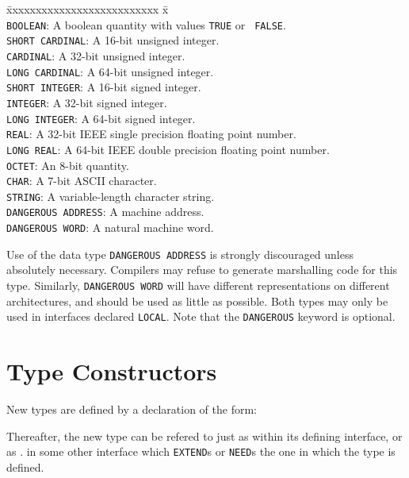 \begin{tabbing}
\= xxxxxxxxxxxxxxxxxxxxxxxxxx \= x \kill \\
\> {\tt BOOLEAN}: \> A boolean quantity with values {\tt TRUE} or {\tt
FALSE}. \\
\> {\tt SHORT CARDINAL}: \> A 16-bit unsigned integer. \\
\> {\tt CARDINAL}: \> A 32-bit unsigned integer.\\
\> {\tt LONG CARDINAL}: \> A 64-bit unsigned integer.\\
\> {\tt SHORT INTEGER}: \> A 16-bit signed integer.\\
\> {\tt INTEGER}: \> A 32-bit signed integer.\\
\> {\tt LONG INTEGER}: \> A 64-bit signed integer.\\
\> {\tt REAL}: \> A 32-bit IEEE single precision floating point number.\\
\> {\tt LONG REAL}: \> A 64-bit IEEE double precision floating point number.\\
\> {\tt OCTET}: \> An 8-bit quantity.\\
\> {\tt CHAR}: \> A 7-bit ASCII character.\\
\> {\tt STRING}: \> A variable-length character string. \\
\> {\tt DANGEROUS ADDRESS}: \> A machine address. \\
\> {\tt DANGEROUS WORD}: \> A natural machine word.
\end{tabbing}

Use of the data type {\tt DANGEROUS ADDRESS} is strongly discouraged
unless absolutely necessary. Compilers may refuse to generate
marshalling code for this type. Similarly, {\tt DANGEROUS WORD} will
have different representations on different architectures, and should
be used as little as possible. Both types may only be used in
interfaces declared {\tt LOCAL}. Note that the {\tt DANGEROUS} keyword
is optional.

\section{Type Constructors}

New types are defined by a declaration of the form:


Thereafter, the new type can be refered to just as  within its defining interface, or as
. in some other interface which
{\tt EXTEND}s or {\tt NEED}s the one in which the type is defined.

